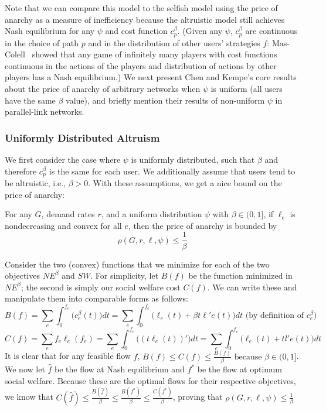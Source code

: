 Note that we can compare this model to the selfish model using the price of anarchy as a measure of inefficiency
because the altruistic model still achieves Nash equilibrium for any $\psi$ and cost function $c^\beta_p$. (Given any $\psi$, $c^\beta_p$ are continuous in the choice of path $p$ and in the distribution of other users' strategies $f$: Mas-Colell~\cite{mascolell} showed that any game of infinitely many players with cost functions continuous in the actions of the players and distribution of actions by other players has a Nash equilibrium.)
We next present Chen and Kempe's core results about the price of anarchy of arbitrary networks when $\psi$ is uniform (all users have the same $\beta$ value), and briefly mention their results of non-uniform $\psi$ in parallel-link networks.

\subsubsection{Uniformly Distributed Altruism}
We first consider the case where $\psi$ is uniformly distributed, such that $\beta$ and therefore $c^\beta_p$ is the same for each user. We additionally assume that users tend to be altruistic, i.e., $\beta > 0$.
With these assumptions, we get a nice bound on the price of anarchy:
\begin{theorem}
For any $G$, demand rates $r$, and 
a uniform distribution $\psi$ with $\beta \in (0, 1]$,
if $\ell_e$ is nondecreasing and convex for all $e$, then the price of anarchy is bounded by 
    $$\rho(G,r,\ell,\psi) \le \frac{1}{\beta}$$
\end{theorem}

\begin{proof-sketch}
    Consider the two (convex) functions that we minimize for each of the two objectives $NE^\beta$ and $SW$. For simplicity, let $B(f)$ be the function minimized in $NE^\beta$; the second is simply our social welfare cost $C(f)$.
    We can write these and manipulate them into comparable forms as follows:
    $$B(f) = \sum_e\int_0^{{f}_e}\Big(c_e^\beta(t)\Big)dt = 
        \sum_e\int_0^{{f}_e} \Big(\ell_e(t) + \beta t\ell'e(t)\Big)dt\text{ (by definition of $c^\beta_e$)}$$
    $$C(f) = \sum_ef_e\ell_e(f_e) = \sum_e\int_0^{f_e} \Big((t\ell_e(t))' \Big)dt 
        = \sum_e\int_0^{f_e} \Big(\ell_e(t) + tl'e(t)\Big)dt$$ 
    It is clear that for any feasible flow $f$, 
    $B(f) \le C(f) \le \frac{B(f)}{\beta} \text{ because $\beta\in(0,1]$}$.
    We now let $\hat{f}$ be the flow at Nash equilibrium and $f^*$ be the flow at optimum social welfare. Because these are the optimal flows for their respective objectives, we know that 
    $C(\hat{f}) \le \frac{B(\hat{f})}{\beta} \le \frac{B(f^*)}{\beta} \le \frac{C(f^*)}{\beta}$,
    proving that 
    $\rho(G,r,\ell,\psi) \le \frac{1}{\beta}$
\end{proof-sketch}

